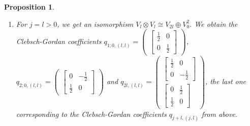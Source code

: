 \documentclass[12pt, a4paper]{article}
\theoremstyle{plain}
\newtheorem{pro}{Proposition}[section]
\theoremstyle{definition}
\theoremstyle{remark}
\begin{document}
\begin{pro}
\begin{enumerate}
\item For $j = l > 0$, we get an isomorphism $V_l \otimes V_l \cong V_{2l} \oplus V_0^2$. We obtain the Clebsch-Gordan coefficients $q_{1; 0,(l,l)} = \begin{pmatrix} \begin{bmatrix} \frac{1}{2} & 0 \\ 0 & \frac{1}{2} \end{bmatrix}\end{pmatrix}$,  $q_{2; 0,(l,l)} = \begin{pmatrix} \begin{bmatrix} 0 & - \frac{1}{2} \\ \frac{1}{2} & 0\end{bmatrix} \end{pmatrix}$ and $q_{2l,(l,l)} = \begin{pmatrix}\begin{bmatrix} \frac{1}{2} & 0 \\ 0 & -\frac{1}{2}\end{bmatrix} \\ \begin{bmatrix} 0 & \frac{1}{2} \\ \frac{1}{2} & 0\end{bmatrix} \end{pmatrix}$, the last one corresponding to the Clebsch-Gordan coefficients $q_{j+l,(j,l)}$ from above.
\end{enumerate}
\end{pro}
\end{document}

